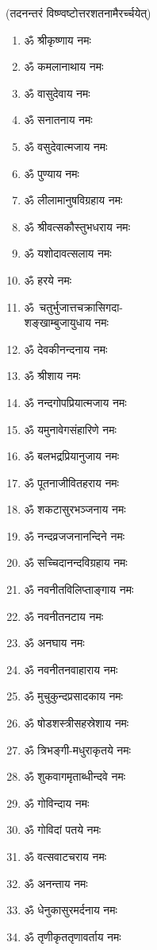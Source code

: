 (तदनन्तरं विष्ण्वष्टोत्तरशतनामैरर्च्चयेत्)\\

\begin{multicols}{2}
\begin{enumerate}
\item ॐ श्रीकृष्णाय नमः
\item ॐ कमलानाथाय नमः
\item ॐ वासुदेवाय नमः
\item ॐ सनातनाय नमः
\item ॐ वसुदेवात्मजाय नमः
\item ॐ पुण्याय नमः
\item ॐ लीलामानुषविग्रहाय नमः
\item ॐ श्रीवत्सकौस्तुभधराय नमः
\item ॐ यशोदावत्सलाय नमः
\item ॐ हरये नमः
\item \mbox{ॐ चतुर्भुजात्तचक्रासिगदा-}\\ शङ्खाम्बुजायुधाय नमः
\item ॐ देवकीनन्दनाय नमः
\item ॐ श्रीशाय नमः
\item ॐ नन्दगोपप्रियात्मजाय नमः
\item ॐ यमुनावेगसंहारिणे नमः
\item ॐ बलभद्रप्रियानुजाय नमः
\item ॐ पूतनाजीवितहराय नमः
\item ॐ शकटासुरभञ्जनाय नमः
\item ॐ नन्दव्रजजनानन्दिने नमः
\item ॐ सच्चिदानन्दविग्रहाय नमः
\item ॐ नवनीतविलिप्ताङ्गाय नमः
\item ॐ नवनीतनटाय नमः
\item ॐ अनघाय नमः
\item ॐ नवनीतनवाहाराय नमः
\item ॐ मुचुकुन्दप्रसादकाय नमः
\item ॐ षोडशस्त्रीसहस्रेशाय नमः
\item ॐ त्रिभङ्गी-मधुराकृतये नमः
\item ॐ शुकवागमृताब्धीन्दवे नमः
\item ॐ गोविन्दाय  नमः
\item ॐ गोविदां पतये नमः
\item ॐ वत्सवाटचराय नमः
\item ॐ अनन्ताय नमः
\item ॐ धेनुकासुरमर्दनाय नमः
\item ॐ तृणीकृततृणावर्ताय नमः

\end{enumerate}
\end{multicols}
